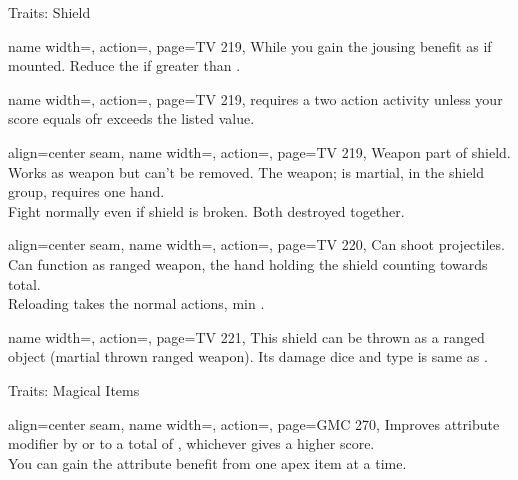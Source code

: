 \begin{PageBack}
\begin{Tables}{\backTableHeight}
\begin{Table}{Traits: Shield}
\begin{entry}{}{%
                name width=\conditionLength,%
                action=\Harnessed,
                page=TV 219,
            }
                While  you gain the jousing benefit as if mounted. Reduce the
                  \Feet if greater than  \Feet.
            \end{entry}
            \begin{entry}{}{%
                name width=\conditionLength,%
                action=\Hefty,
                page=TV 219,
            }
                 requires a two action activity unless your \Strength score equals ofr
                exceeds the listed value.
            \end{entry}
            \begin{entry}{}{%
                align=center seam,
                name width=\conditionLength,%
                action=\Integrated,
                page=TV 219,
            }
                Weapon part of shield. Works as  weapon but can't be removed. The weapon; is
                martial, in the shield group, requires one hand. \\
                Fight normally even if shield is broken. Both destroyed together.
            \end{entry}
            \begin{entry}{}{%
                align=center seam,
                name width=\conditionLength,%
                action=\Launching,
                page=TV 220,
            }
                Can shoot projectiles. Can function as ranged weapon, the hand holding the shield counting
                towards total.\\ Reloading takes the normal  actions, min .
            \end{entry}
            \begin{entry}{}{%
                name width=\conditionLength,%
                action=\ShieldThrow,
                page=TV 221,
            }
                This shield can be thrown as a ranged object {(martial thrown ranged weapon)}. Its damage dice
                and type is same as .
            \end{entry}
        \end{Table}
        \TableSpace
        \begin{Table}{Traits: Magical Items}
            \begin{entry}{}{%
                align=center seam,
                name width=\conditionLength,%
                action=\Apex,
                page=GMC 270,
            }
                Improves attribute modifier by  or to a total of , whichever gives a higher score. \hfill{} \\You can gain the attribute benefit from one apex item at a time.

\end{entry}
\end{Table}
\end{Tables}
\end{PageBack}

